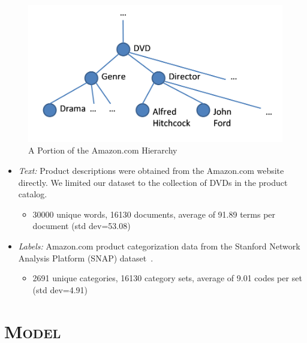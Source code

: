\documentclass[portrait]{sciposter}
\begin{document}
\begin{multicols}{3}
\begin{figure}
\centering
\includegraphics[width=25cm]{Amazon_crop}
\small{\caption{A Portion of the Amazon.com Hierarchy}}
\end{figure}

\begin{itemize}
\item \emph{Text:} Product descriptions were obtained from the Amazon.com website directly. We limited our dataset to the collection of DVDs in the product catalog.
\begin{itemize}
\item 30000 unique words, 16130 documents, average of 91.89 terms per document (std dev=53.08)
\end{itemize}
\item \emph{Labels:} Amazon.com product categorization data from the Stanford Network Analysis Platform (SNAP) dataset~\citep{SNAP}.
\begin{itemize}
\item 2691 unique categories, 16130 category sets, average of 9.01 codes per set (std dev=4.91) \newline \newline \newline \newline \newline \newline \newline \newline \newline
\end{itemize}
\end{itemize}


\section{\textsc{Model}}


\end{multicols}
\end{document}
